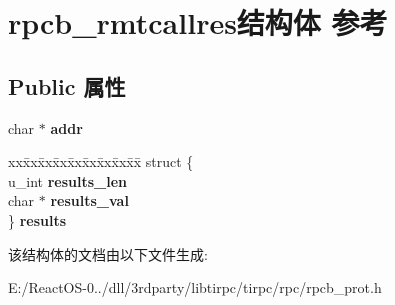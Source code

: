 \hypertarget{structrpcb__rmtcallres}{}\section{rpcb\+\_\+rmtcallres结构体 参考}
\label{structrpcb__rmtcallres}
\subsection*{Public 属性}
\begin{DoxyCompactItemize}
\item 
\mbox{\label{structrpcb__rmtcallres_accf756a10558160918b6d66268ba6523}} 
char $\ast$ {\bfseries addr}
\item 
\mbox{\label{structrpcb__rmtcallres_a47bff74bfb7e7862580bb498ed42b578}} 
\begin{tabbing}
xx\=xx\=xx\=xx\=xx\=xx\=xx\=xx\=xx\=\kill
struct \{\\
\>u\_int {\bfseries results\_len}\\
\>char $\ast$ {\bfseries results\_val}\\
\} {\bfseries results}\\

\end{tabbing}\end{DoxyCompactItemize}


该结构体的文档由以下文件生成\+:\begin{DoxyCompactItemize}
\item 
E\+:/\+React\+O\+S-\/0../dll/3rdparty/libtirpc/tirpc/rpc/rpcb\+\_\+prot.\+h\end{DoxyCompactItemize}
